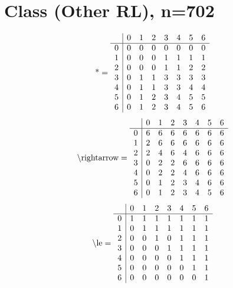 \documentclass[11pt]{article}
\begin{document}
\section{Class (Other RL), n=702}
\[\text{*} = 
\begin{array}{r | r r r r r r r}
 & 0 & 1 & 2 & 3 & 4 & 5 & 6 \\ \hline
0 & 0 & 0 & 0 & 0 & 0 & 0 & 0 \\
1 & 0 & 0 & 0 & 1 & 1 & 1 & 1 \\
2 & 0 & 0 & 0 & 1 & 1 & 2 & 2 \\
3 & 0 & 1 & 1 & 3 & 3 & 3 & 3 \\
4 & 0 & 1 & 1 & 3 & 3 & 4 & 4 \\
5 & 0 & 1 & 2 & 3 & 4 & 5 & 5 \\
6 & 0 & 1 & 2 & 3 & 4 & 5 & 6 \\
\end{array}
\]
\[\text{\textbackslash rightarrow} = 
\begin{array}{r | r r r r r r r}
 & 0 & 1 & 2 & 3 & 4 & 5 & 6 \\ \hline
0 & 6 & 6 & 6 & 6 & 6 & 6 & 6 \\
1 & 2 & 6 & 6 & 6 & 6 & 6 & 6 \\
2 & 2 & 4 & 6 & 4 & 6 & 6 & 6 \\
3 & 0 & 2 & 2 & 6 & 6 & 6 & 6 \\
4 & 0 & 2 & 2 & 4 & 6 & 6 & 6 \\
5 & 0 & 1 & 2 & 3 & 4 & 6 & 6 \\
6 & 0 & 1 & 2 & 3 & 4 & 5 & 6 \\
\end{array}
\]
\[\text{\textbackslash le} = 
\begin{array}{r | r r r r r r r}
 & 0 & 1 & 2 & 3 & 4 & 5 & 6 \\ \hline
0 & 1 & 1 & 1 & 1 & 1 & 1 & 1 \\
1 & 0 & 1 & 1 & 1 & 1 & 1 & 1 \\
2 & 0 & 0 & 1 & 0 & 1 & 1 & 1 \\
3 & 0 & 0 & 0 & 1 & 1 & 1 & 1 \\
4 & 0 & 0 & 0 & 0 & 1 & 1 & 1 \\
5 & 0 & 0 & 0 & 0 & 0 & 1 & 1 \\
6 & 0 & 0 & 0 & 0 & 0 & 0 & 1 \\
\end{array}
\]
\end{document}
